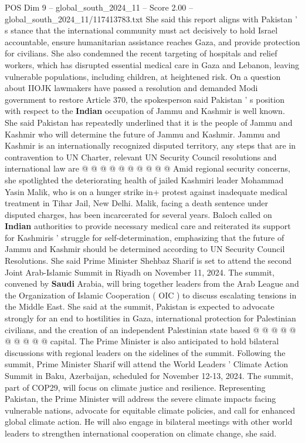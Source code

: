 \begin{textsample}{POS Dim 9 – global\_south\_2024\_11 – Score 2.00 – global\_south\_2024\_11/117413783.txt}
She said this report aligns with Pakistan ' s stance that the international community must act decisively to hold Israel accountable, ensure humanitarian assistance reaches Gaza, and provide protection for civilians.
She also condemned the recent targeting of hospitals and relief workers, which has disrupted essential medical care in Gaza and Lebanon, leaving vulnerable populations, including children, at heightened risk.
On a question about IIOJK lawmakers have passed a resolution and demanded Modi government to restore Article 370, the spokesperson said Pakistan ' s position with respect to the \textbf{Indian} occupation of Jammu and Kashmir is well known.
She said Pakistan has repeatedly underlined that it is the people of Jammu and Kashmir who will determine the future of Jammu and Kashmir.
Jammu and Kashmir is an internationally recognized disputed territory, any steps that are in contravention to UN Charter, relevant UN Security Council resolutions and international law are @ @ @ @ @ @ @ @ @ @ Amid regional security concerns, she spotlighted the deteriorating health of jailed Kashmiri leader Mohammad Yasin Malik, who is on a hunger strike in+ protest against inadequate medical treatment in Tihar Jail, New Delhi.
Malik, facing a death sentence under disputed charges, has been incarcerated for several years.
Baloch called on \textbf{Indian} authorities to provide necessary medical care and reiterated its support for Kashmiris ' struggle for self-determination, emphasizing that the future of Jammu and Kashmir should be determined according to UN Security Council Resolutions.
She said Prime Minister Shehbaz Sharif is set to attend the second Joint Arab-Islamic Summit in Riyadh on November 11, 2024.
The summit, convened by \textbf{Saudi} Arabia, will bring together leaders from the Arab League and the Organization of Islamic Cooperation ( OIC ) to discuss escalating tensions in the Middle East.
She said at the summit, Pakistan is expected to advocate strongly for an end to hostilities in Gaza, international protection for Palestinian civilians, and the creation of an independent Palestinian state based @ @ @ @ @ @ @ @ @ @ capital.
The Prime Minister is also anticipated to hold bilateral discussions with regional leaders on the sidelines of the summit.
Following the summit, Prime Minister Sharif will attend the World Leaders ' Climate Action Summit in Baku, Azerbaijan, scheduled for November 12-13, 2024.
The summit, part of COP29, will focus on climate justice and resilience.
Representing Pakistan, the Prime Minister will address the severe climate impacts facing vulnerable nations, advocate for equitable climate policies, and call for enhanced global climate action.
He will also engage in bilateral meetings with other world leaders to strengthen international cooperation on climate change, she said.

\end{textsample}
